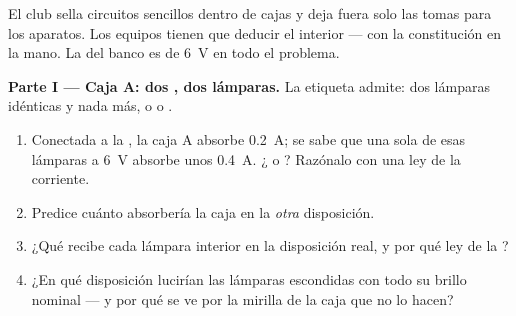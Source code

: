 \begin{problem}\label{pb:g8:circuit-laws:1}
El club sella circuitos sencillos dentro de cajas y deja fuera solo las
tomas para los aparatos. Los equipos tienen que deducir el interior ---
con la constitución en la mano. La  del banco es de
\qty{6}{V} en todo el problema.

\medskip\noindent\textbf{Parte I --- Caja A: dos , dos
lámparas.}
La etiqueta admite: dos lámparas idénticas y nada más, o
 o .
\begin{enumerate}
  \item Conectada a la , la caja A absorbe \qty{0.2}{A}; se
        sabe que una sola de esas lámparas a \qty{6}{V} absorbe unos
        \qty{0.4}{A}. ¿ o ? Razónalo con una ley
        de la corriente.
  \item Predice cuánto absorbería la caja en la \emph{otra}
        disposición.
  \item ¿Qué  recibe cada lámpara interior en la
        disposición real, y por qué ley de la ?
  \item ¿En qué disposición lucirían las lámparas escondidas con
        todo su brillo nominal --- y por qué se ve por la mirilla de
        la caja que no lo hacen?
\end{enumerate}


\end{problem}
